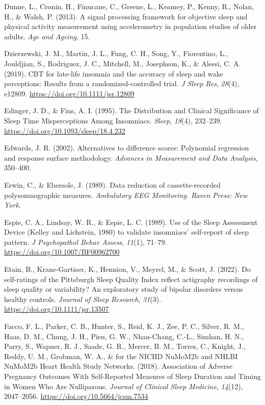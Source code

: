 \documentclass[
]{article}
\newlength{\cslhangindent}
\newenvironment{CSLReferences}[2] %
 {\begin{list}{}{%
  \setlength{\itemindent}{0pt}
  \setlength{\leftmargin}{0pt}
  \setlength{\parsep}{0pt}
  \ifodd #1
   \setlength{\leftmargin}{\cslhangindent}
   \setlength{\itemindent}{-1\cslhangindent}
  \fi
  \setlength{\itemsep}{#2\baselineskip}}}
 {\end{list}}
\begin{document}
\begin{CSLReferences}{1}{0}
Dunne, L., Cronin, H., Finucane, C., Greene, L., Keamey, P., Kenny, R., Nolan, H., \& Walsh, P. (2013). A signal processing framework for objective sleep and physical activity measurement using accelerometry in population studies of older adults. \emph{Age and Ageing}, 15.

Dzierzewski, J. M., Martin, J. L., Fung, C. H., Song, Y., Fiorentino, L., Jouldjian, S., Rodriguez, J. C., Mitchell, M., Josephson, K., \& Alessi, C. A. (2019). {CBT} for late-life insomnia and the accuracy of sleep and wake perceptions: {Results} from a randomized-controlled trial. \emph{J Sleep Res}, \emph{28}(4), e12809. \url{https://doi.org/10.1111/jsr.12809}

Edinger, J. D., \& Fins, A. I. (1995). The {Distribution} and {Clinical} {Significance} of {Sleep} {Time} {Misperceptions} {Among} {Insomniacs}. \emph{Sleep}, \emph{18}(4), 232--239. \url{https://doi.org/10.1093/sleep/18.4.232}

Edwards, J. R. (2002). Alternatives to difference scores: Polynomial regression and response surface methodology. \emph{Advances in Measurement and Data Analysis}, 350--400.

Erwin, C., \& Ebersole, J. (1989). Data reduction of cassette-recorded polysomnographic measures. \emph{Ambulatory EEG Monitoring. Raven Press: New York}.

Espie, C. A., Lindsay, W. R., \& Espie, L. C. (1989). Use of the {Sleep} {Assessment} {Device} ({Kelley} and {Lichstein}, 1980) to validate insomniacs' self-report of sleep pattern. \emph{J Psychopathol Behav Assess}, \emph{11}(1), 71--79. \url{https://doi.org/10.1007/BF00962700}

Etain, B., Krane‐Gartiser, K., Hennion, V., Meyrel, M., \& Scott, J. (2022). Do self‐ratings of the {Pittsburgh} {Sleep} {Quality} {Index} reflect actigraphy recordings of sleep quality or variability? {An} exploratory study of bipolar disorders versus healthy controls. \emph{Journal of Sleep Research}, \emph{31}(3). \url{https://doi.org/10.1111/jsr.13507}

Facco, F. L., Parker, C. B., Hunter, S., Reid, K. J., Zee, P. C., Silver, R. M., Haas, D. M., Chung, J. H., Pien, G. W., Nhan-Chang, C.-L., Simhan, H. N., Parry, S., Wapner, R. J., Saade, G. R., Mercer, B. M., Torres, C., Knight, J., Reddy, U. M., Grobman, W. A., \& for the NICHD NuMoM2b and NHLBI NuMoM2b Heart Health Study Networks. (2018). Association of {Adverse} {Pregnancy} {Outcomes} {With} {Self}-{Reported} {Measures} of {Sleep} {Duration} and {Timing} in {Women} {Who} {Are} {Nulliparous}. \emph{Journal of Clinical Sleep Medicine}, \emph{14}(12), 2047--2056. \url{https://doi.org/10.5664/jcsm.7534}


\end{CSLReferences}
\end{document}
